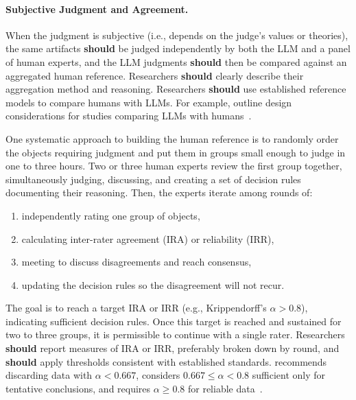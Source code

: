 \documentclass[smallextended]{svjour3}
\newcommand{\should}{\textbf{should}\xspace}
\newcommand{\guidelineparagraph}[1]{\paragraph{#1.}}
\newcommand{\guidelineparagraph}[1]{\paragraph{#1}}
\begin{document}
\guidelineparagraph{Subjective Judgment and Agreement}
When the judgment is subjective (i.e., depends on the judge's values or theories), the same artifacts \should be judged independently by both the LLM and a panel of human experts, and the LLM judgments \should then be compared against an aggregated human reference. Researchers \should clearly describe their aggregation method and reasoning.
Researchers \should use established reference models to compare humans with LLMs.
For example, \citeauthor{DBLP:conf/icse/SchneiderFW25} outline design considerations for studies comparing LLMs with humans~\cite{DBLP:conf/icse/SchneiderFW25}.

One systematic approach to building the human reference is to randomly order the objects requiring judgment and put them in groups small enough to judge in one to three hours. Two or three human experts review the first group together, simultaneously judging, discussing, and creating a set of decision rules documenting their reasoning. Then, the experts iterate among rounds of:
\begin{enumerate}
    \item independently rating one group of objects,
    \item calculating inter-rater agreement (IRA) or reliability (IRR),
    \item meeting to discuss disagreements and reach consensus,
    \item updating the decision rules so the disagreement will not recur.
\end{enumerate}

The goal is to reach a target IRA or IRR (e.g., Krippendorff's $\alpha>0.8$), indicating sufficient decision rules. Once this target is reached and sustained for two to three groups, it is permissible to continue with a single rater.
Researchers \should report measures of IRA or IRR, preferably broken down by round, and \should apply thresholds consistent with established standards. \citeauthor{Krippendorff2018} recommends discarding data with $\alpha<0.667$, considers $0.667 \leq \alpha < 0.8$ sufficient only for tentative conclusions, and requires $\alpha \geq 0.8$ for reliable data~\cite{Krippendorff2018}.
\end{document}
